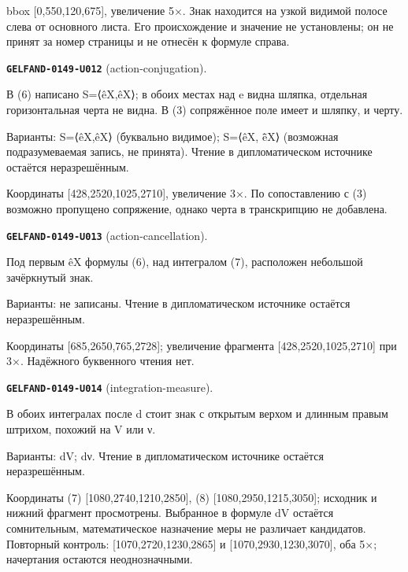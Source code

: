 \documentclass[11pt]{article}
\theoremstyle{definition}
\theoremstyle{remark}
\begin{document}
bbox [0,550,120,675], увеличение 5×. Знак находится на узкой видимой полосе слева от основного листа. Его происхождение и значение не установлены; он не принят за номер страницы и не отнесён к формуле справа.\par\medskip
\noindent\leavevmode{}\label{GELFAND-P001370:action-conjugation:note}\textbf{\texttt{GELFAND-0149-U012}} (action-conjugation).\par\nopagebreak[4]
В (6) написано S=⟨êX,êX⟩; в обоих местах над e видна шляпка, отдельная горизонтальная черта не видна. В (3) сопряжённое поле имеет и шляпку, и черту.\par
Варианты: S=⟨êX,êX⟩ (буквально видимое); S=⟨êX, ē̂X⟩ (возможная подразумеваемая запись, не принята). Чтение в дипломатическом источнике остаётся неразрешённым.\par
Координаты [428,2520,1025,2710], увеличение 3×. По сопоставлению с (3) возможно пропущено сопряжение, однако черта в транскрипцию не добавлена.\par\medskip
\noindent\leavevmode{}\label{GELFAND-P001370:action-cancellation:note}\textbf{\texttt{GELFAND-0149-U013}} (action-cancellation).\par\nopagebreak[4]
Под первым êX формулы (6), над интегралом (7), расположен небольшой зачёркнутый знак.\par
Варианты: не записаны. Чтение в дипломатическом источнике остаётся неразрешённым.\par
Координаты [685,2650,765,2728]; увеличение фрагмента [428,2520,1025,2710] при 3×. Надёжного буквенного чтения нет.\par\medskip
\noindent\leavevmode{}\label{GELFAND-P001370:integration-measure:note}\textbf{\texttt{GELFAND-0149-U014}} (integration-measure).\par\nopagebreak[4]
В обоих интегралах после d стоит знак с открытым верхом и длинным правым штрихом, похожий на V или ν.\par
Варианты: dV; dν. Чтение в дипломатическом источнике остаётся неразрешённым.\par
Координаты (7) [1080,2740,1210,2850], (8) [1080,2950,1215,3050]; исходник и нижний фрагмент просмотрены. Выбранное в формуле dV остаётся сомнительным, математическое назначение меры не различает кандидатов. Повторный контроль: [1070,2720,1230,2865] и [1070,2930,1230,3070], оба 5×; начертания остаются неоднозначными.\par\medskip
\end{document}
